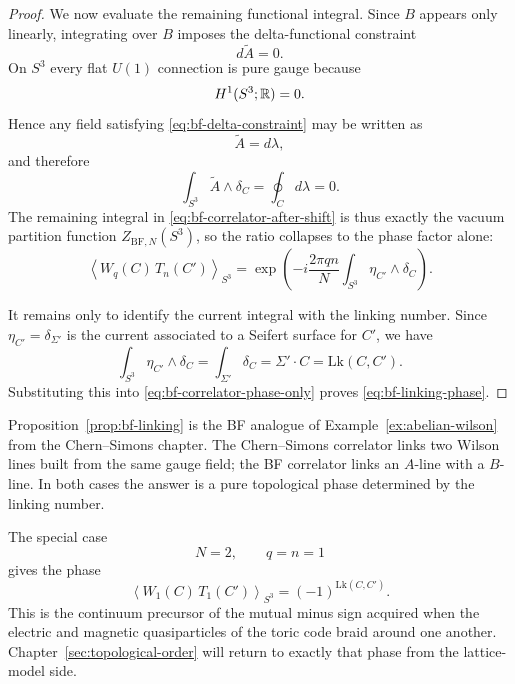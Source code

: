 \begin{proof}
\medskip

\noindent We now evaluate the remaining functional integral. Since $B$ appears only linearly, integrating over $B$ imposes the delta-functional constraint
\begin{equation}\label{eq:bf-delta-constraint}
d\widetilde{A}=0.
\end{equation}
On $S^3$ every flat $U(1)$ connection is pure gauge because
\begin{equation*}
H^1(S^3;\mathbb{R})=0.
\end{equation*}
Hence any field satisfying \eqref{eq:bf-delta-constraint} may be written as
\begin{equation*}
\widetilde{A}=d\lambda,
\end{equation*}
and therefore
\begin{equation*}
\int_{S^3}\widetilde{A}\wedge \delta_C
=
\oint_C d\lambda
=
0.
\end{equation*}
The remaining integral in \eqref{eq:bf-correlator-after-shift} is thus exactly the vacuum partition function $Z_{\mathrm{BF},N}(S^3)$, so the ratio collapses to the phase factor alone:
\begin{equation}\label{eq:bf-correlator-phase-only}
\left\langle W_q(C)\,T_n(C')\right\rangle_{S^3}
=
\exp\!\left(
-i\frac{2\pi q n}{N}\int_{S^3} \eta_{C'}\wedge \delta_C
\right).
\end{equation}

\medskip

\noindent It remains only to identify the current integral with the linking number. Since $\eta_{C'}=\delta_{\Sigma'}$ is the current associated to a Seifert surface for $C'$, we have
\begin{equation*}
\int_{S^3}\eta_{C'}\wedge \delta_C
=
\int_{\Sigma'} \delta_C
=
\Sigma'\cdot C
=
\mathrm{Lk}(C,C').
\end{equation*}
Substituting this into \eqref{eq:bf-correlator-phase-only} proves \eqref{eq:bf-linking-phase}.
\end{proof}

\begin{remark}\label{rem:bf-linking-physics}
Proposition~\ref{prop:bf-linking} is the BF analogue of Example~\ref{ex:abelian-wilson} from the Chern--Simons chapter. The Chern--Simons correlator links two Wilson lines built from the same gauge field; the BF correlator links an $A$-line with a $B$-line. In both cases the answer is a pure topological phase determined by the linking number.

\medskip

\noindent The special case
\begin{equation*}
N=2,
\qquad
q=n=1
\end{equation*}
gives the phase
\begin{equation*}
\left\langle W_1(C)\,T_1(C')\right\rangle_{S^3}
=
(-1)^{\mathrm{Lk}(C,C')}.
\end{equation*}
This is the continuum precursor of the mutual minus sign acquired when the electric and magnetic quasiparticles of the toric code braid around one another. Chapter~\ref{sec:topological-order} will return to exactly that phase from the lattice-model side.
\end{remark}

